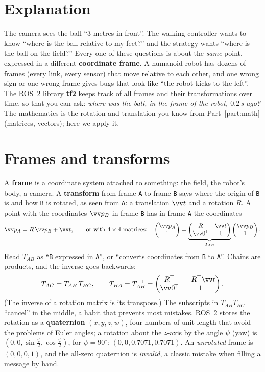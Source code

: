 \label{ch:ros4}

\section*{Explanation}
The camera sees the ball ``$3$ metres in front''. The walking controller wants to know ``where is the ball relative to my feet?'' and the strategy wants ``where is the ball on the field?'' Every one of these questions is about the \emph{same} point, expressed in a different \textbf{coordinate frame}. A humanoid robot has dozens of frames (every link, every sensor) that move relative to each other, and one wrong sign or one wrong frame gives bugs that look like ``the robot kicks to the left''. The ROS~2 library \textbf{tf2} keeps track of all frames and their transformations over time, so that you can ask: \emph{where was the ball, in the frame of the robot, $0.2$\,s ago?} The mathematics is the rotation and translation you know from Part~\ref{part:math} (matrices, vectors); here we apply it.

\section*{Frames and transforms}
A \textbf{frame} is a coordinate system attached to something: the field, the robot's body, a camera. A \textbf{transform} from frame \verb!A! to frame \verb!B! says where the origin of \verb!B! is and how \verb!B! is rotated, as seen from \verb!A!: a translation $\vv t$ and a rotation $R$. A point with the coordinates $\vv p_B$ in frame \verb!B! has in frame \verb!A! the coordinates
\[
\vv p_A=R\,\vv p_B+\vv t,\qquad\text{or with $4\times4$ matrices:}\quad
\begin{pmatrix}\vv p_A\\1\end{pmatrix}=\underbrace{\begin{pmatrix}R&\vv t\\\vv 0^{\!\top}&1\end{pmatrix}}_{T_{AB}}\begin{pmatrix}\vv p_B\\1\end{pmatrix}.
\]
Read $T_{AB}$ as ``\verb!B! expressed in \verb!A!'', or ``converts coordinates from \verb!B! to \verb!A!''. Chains are products, and the inverse goes backwards:
\[
T_{AC}=T_{AB}\,T_{BC},\qquad T_{BA}=T_{AB}^{-1}=\begin{pmatrix}R^{\top}&-R^{\top}\vv t\\\vv 0^{\!\top}&1\end{pmatrix}.
\]
(The inverse of a rotation matrix is its transpose.) The subscripts in $T_{AB}T_{BC}$ ``cancel'' in the middle, a habit that prevents most mistakes. ROS~2 stores the rotation as a \textbf{quaternion} $(x,y,z,w)$, four numbers of unit length that avoid the problems of Euler angles; a rotation about the $z$-axis by the angle $\psi$ (yaw) is $(0,0,\sin\tfrac\psi2,\cos\tfrac\psi2)$, for $\psi=90^\circ$: $(0,0,0.7071,0.7071)$. An \emph{unrotated} frame is $(0,0,0,1)$, and the all-zero quaternion is \emph{invalid}, a classic mistake when filling a message by hand.

